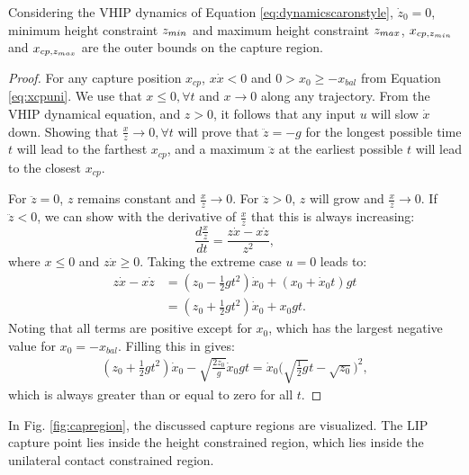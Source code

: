 \begin{lem}\label{lem:regionz}
Considering the \ac{VHIP} dynamics of Equation \ref{eq:dynamicscaronstyle}, $\dot{z}_0=0$, minimum height constraint $z_{min}$ and maximum height constraint $z_{max}$, $x_{cp,z_{min}}$ and $x_{cp,z_{max}}$ are the outer bounds on the capture region.
\end{lem}
\begin{proof}
For any capture position $x_{cp}$, $x\dot{x}<0$ \cite{koolen2016balance} and $0>x_0\geq-x_{bal}$ from Equation \ref{eq:xcpuni}. 
We use that $x \leq 0, \forall t$ and $x\rightarrow 0$ along any trajectory. From the \ac{VHIP} dynamical equation, and $z>0$, it follows that any input $u$ will slow $\dot{x}$ down. Showing that $\frac{x}{z}\rightarrow 0, \forall t$ will prove that $\ddot{z}=-g$ for the longest possible time $t$ will lead to the farthest $x_{cp}$, and a maximum $\ddot{z}$ at the earliest possible $t$ will lead to the closest $x_{cp}$. 

For $\ddot{z}=0$, $z$ remains constant and $\frac{x}{z}\rightarrow 0$. For $\ddot{z}>0$, $z$ will grow and $\frac{x}{z}\rightarrow 0$. If $\ddot{z}<0$, we can show with the derivative of $\frac{x}{z}$ that this is always increasing:
\begin{equation}
\frac{d\frac{x}{z}}{dt}= \frac{z\dot{x}-x\dot{z}}{z^2},
\end{equation}
where $x \leq 0$ and $z \dot{x} \geq 0$. Taking the extreme case $u=0$ leads to:
\begin{align}
	z\dot{x}-x\dot{z} &= (z_0 - \frac{1}{2}gt^2)\dot{x}_0 + (x_0 + \dot{x}_0 t)gt\\
	&= (z_0 +\frac{1}{2}gt^2)\dot{x}_0 + x_0gt.
\end{align}
Noting that all terms are positive except for $x_0$, which has the largest negative value for $x_0=-x_{bal}$. Filling this in gives:
\begin{align}
	(z_0 +\frac{1}{2}gt^2)\dot{x}_0 - \sqrt{\frac{2z_0}{g}}\dot{x}_0gt = \dot{x}_0\bigg(\sqrt{\frac{1}{2}g}t - \sqrt{z_0}\bigg)^2,
\end{align}
which is always greater than or equal to zero for all $t$.
\end{proof}
In Fig. \ref{fig:capregion}, the discussed capture regions are visualized. The LIP capture point lies inside the height constrained region, which lies inside the unilateral contact constrained region.
